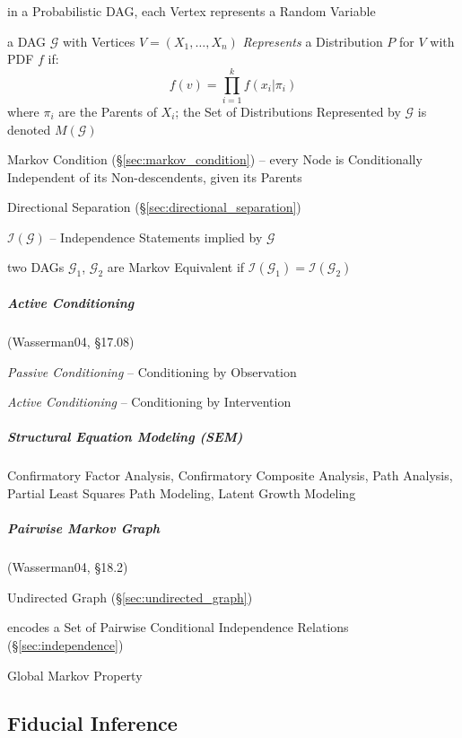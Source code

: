 in a Probabilistic DAG, each Vertex represents a Random Variable

a DAG $\mathcal{G}$ with Vertices $V = (X_1, \ldots, X_n)$ \emph{Represents} a
Distribution $P$ for $V$ with PDF $f$ if:
\[
  f(v) = \prod_{i=1}^k f(x_i | \pi_i)
\]
where $\pi_i$ are the Parents of $X_i$; the Set of Distributions Represented by
$\mathcal{G}$ is denoted $M(\mathcal{G})$

Markov Condition (\S\ref{sec:markov_condition}) -- every Node is Conditionally
Independent of its Non-descendents, given its Parents

Directional Separation (\S\ref{sec:directional_separation})

$\mathcal{I}(\mathcal{G})$ -- Independence Statements implied by $\mathcal{G}$

two DAGs $\mathcal{G}_1$, $\mathcal{G}_2$ are Markov Equivalent if
$\mathcal{I}(\mathcal{G}_1) = \mathcal{I}(\mathcal{G}_2)$



\subparagraph{Active Conditioning}\label{sec:active_conditioning}\hfill

(Wasserman04, \S17.08)

\emph{Passive Conditioning} -- Conditioning by Observation

\emph{Active Conditioning} -- Conditioning by Intervention



\subparagraph{Structural Equation Modeling (SEM)}\label{sec:sem}\hfill


Confirmatory Factor Analysis, Confirmatory Composite Analysis, Path Analysis,
Partial Least Squares Path Modeling, Latent Growth Modeling



\subparagraph{Pairwise Markov Graph}\label{sec:pairwise_markov}\hfill

(Wasserman04, \S18.2)

Undirected Graph (\S\ref{sec:undirected_graph})

encodes a Set of Pairwise Conditional Independence Relations
(\S\ref{sec:independence})

Global Markov Property



\subsection{Fiducial Inference}\label{sec:fiducial_inference}

